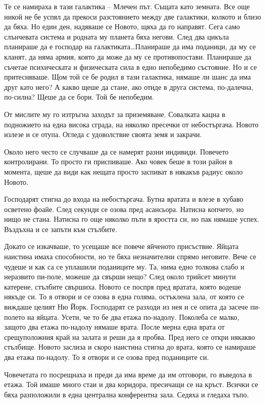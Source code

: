 \documentclass[ebook,openany,12pt]{memoir}
\begin{document}
Те се намираха в тази галактика – Млечен път. Същата като земната. Все още никой не бе успял да прекоси разстоянието между две галактики, колкото и близо да бяха. Но един ден, надяваше се Новото, щяха да го направят. Сега само слънчевата система и родната му планета бяха негови. След два цикъла планираше да е господар на галактиката\ldots Планираше да има поданици, да му се кланят, да няма армия, която да може да му се противопостави. Планираше да съчетае психическата и физическата сила в едно непобедимо състояние. Но и се притесняваше. Щом той се бе родил в тази галактика, нямаше ли шанс да има друг като него? А какво щеше да стане, ако отиде в друга система, по-далечна, по-силна? Щеше да се бори. Той бе непобедим.

От мислите му го изтръгна заходът за приземяване. Совалката кацна в подножието на една висока сграда, на няколко пресечки от небостъргача. Новото излезе и се отупа. Огледа с удоволствие своята земя и закрачи.

Около него често се случваше да се намерят разни индивиди. Повечето контролирани. То просто ги приспиваше. Ако човек беше в този район в момента, щеше да види как нещата просто заспиват в някакъв радиус около Новото. 

Господарят стигна до входа на небостъргача. Бутна вратата и влезе в хубаво осветено фоайе. След секунди се озова пред асансьора. Натисна копчето, но нищо не стана. Натисна го още няколко пъти в яростта си, но пак нямаше успех. Въздъхна и се запъти към стълбите.

Докато се изкачваше, то усещаше все повече яйченото присъствие. Яйцата наистина имаха способности, но те бяха незначителни спрямо неговите. Вече се чудеше и как са се уплашили поданиците му. Та, нима едно толкова слабо и неразвито пи-поле, можеше да свърши нещо? След около трийсет минути катерене, стълбите свършиха. Новото се поспря пред вратата, която водеше някъде си. То я отвори и се озова в една голяма, остъклена зала, от която се виждаше целият Ню Йорк. Господарят се разходи из нея и се опита да засече пи-полето на яйцата. Усети, че то бе два етажа по-надолу. Поколеба се малко, защото два етажа по-надолу нямаше врата. После мерна една врата от срещуположния край на залата и реши да я пробва. Пред него се откри някакво стълбище. Новото заслиза и скоро наистина стигна до врата, която се намираше два етажа по-надолу. То я отвори и се озова пред поданиците си.

Човечетата го посрещнаха и преди да има време да им отговори, го въведоха в етажа. Той имаше много стаи и два коридора, пресичащи се на кръст. Всички се бяха разположили в една централна конферентна зала. Седяха и гледаха тъпо.
\end{document}
